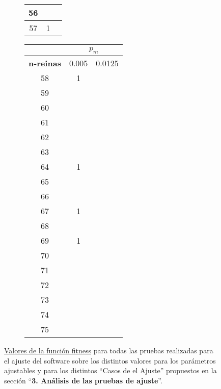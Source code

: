 \begin{figure}[H]
\begin{subfigure}{0.3\textwidth}
\begin{adjustbox}{width=\textwidth}
\begin{tabular}{|c|c|c|}
				56&\cellcolor{green!25}{0}&\cellcolor{green!25}{0}\\ \hline
				57& 1 &\cellcolor{green!25}{0}\\ \hline
			\end{tabular}
		\end{adjustbox}
	\end{subfigure}
	\begin{subfigure}{0.3\textwidth}
		\begin{adjustbox}{width=\textwidth} 
			\begin{tabular}{|c|c|c|}
				\hline
				\rowcolor{blue!25} & \multicolumn{2}{c|}{\textbf{$p_m$}} \\ \hline
				\rowcolor{blue!25} \textbf{n-reinas} & 0.005 & 0.0125 \\ \hline
				58& 1 &\cellcolor{green!25}{0}\\ \hline
				59&\cellcolor{green!25}{0}&\cellcolor{green!25}{0}\\ \hline
				60&\cellcolor{green!25}{0}&\cellcolor{green!25}{0}\\ \hline
				61&\cellcolor{green!25}{0}&\cellcolor{green!25}{0}\\ \hline
				62&\cellcolor{green!25}{0}&\cellcolor{green!25}{0}\\ \hline
				63&\cellcolor{green!25}{0}&\cellcolor{green!25}{0}\\ \hline
				64& 1 &\cellcolor{green!25}{0}\\ \hline
				65&\cellcolor{green!25}{0}&\cellcolor{green!25}{0}\\ \hline
				66&\cellcolor{green!25}{0}&\cellcolor{green!25}{0}\\ \hline
				67& 1 &\cellcolor{green!25}{0}\\ \hline
				68&\cellcolor{green!25}{0}&\cellcolor{green!25}{0}\\ \hline
				69& 1 &\cellcolor{green!25}{0}\\ \hline
				70&\cellcolor{green!25}{0}&\cellcolor{green!25}{0}\\ \hline
				71&\cellcolor{green!25}{0}&\cellcolor{green!25}{0}\\ \hline
				72&\cellcolor{green!25}{0}&\cellcolor{green!25}{0}\\ \hline
				73&\cellcolor{green!25}{0}&\cellcolor{green!25}{0}\\ \hline
				74&\cellcolor{green!25}{0}&\cellcolor{green!25}{0}\\ \hline
				75&\cellcolor{green!25}{0}&\cellcolor{green!25}{0}\\ \hline
			\end{tabular}
		\end{adjustbox}
	\end{subfigure}
	\caption{\underline{Valores de la función fitness} para todas las pruebas realizadas para el ajuste del software sobre los 
	distintos valores para los parámetros ajustables y para los distintos ``Casos de el Ajuste'' propuestos en la sección 
	``\textbf{3. Análisis de las pruebas de ajuste}''.}
    \label{fig:valores-fitness}
\end{figure}




